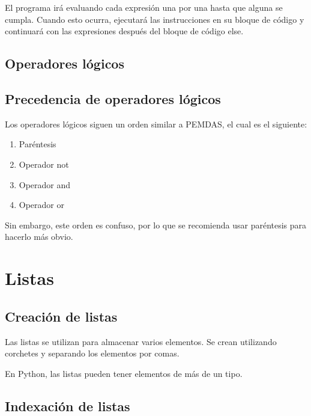 \documentclass{report}
\begin{document}

El programa irá evaluando cada expresión una por una hasta que alguna se cumpla. Cuando esto ocurra, ejecutará las instrucciones en su bloque de código y continuará con las expresiones después del bloque de código else.

\section{Operadores lógicos}

\section{Precedencia de operadores lógicos}

Los operadores lógicos siguen un orden similar a PEMDAS, el cual es el siguiente:

\begin{enumerate}
  \item Paréntesis
  \item Operador not
  \item Operador and
  \item Operador or
\end{enumerate}

Sin embargo, este orden es confuso, por lo que se recomienda usar paréntesis para hacerlo más obvio.


\clearpage\chapter{Listas}

\section{Creación de listas}

Las listas se utilizan para almacenar varios elementos. Se crean utilizando corchetes y separando los elementos por comas.


En Python, las listas pueden tener elementos de más de un tipo.


\section{Indexación de listas}
\end{document}
